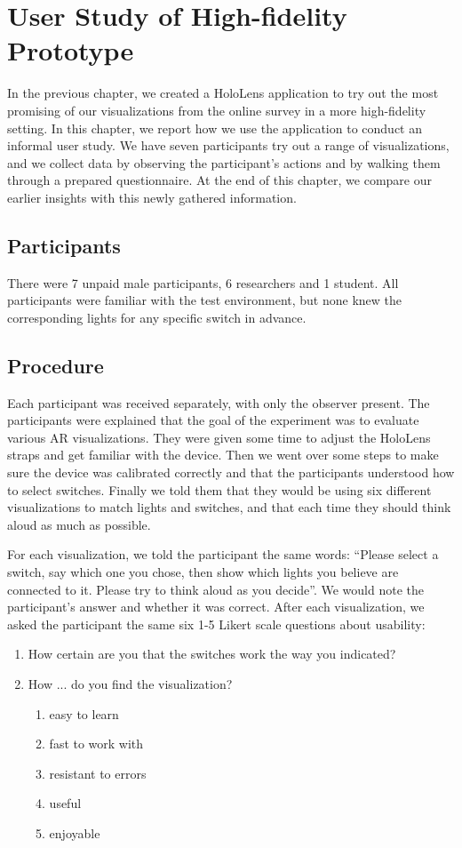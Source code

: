 \chapter{User Study of High-fidelity Prototype} \label{chap:user}
In the previous chapter, we created a HoloLens application to try out the most promising of our visualizations from the online survey in a more high-fidelity setting. In this chapter, we report how we use the application to conduct an informal user study. We have seven participants try out a range of visualizations, and we collect data by observing the participant's actions and by walking them through a prepared questionnaire. At the end of this chapter, we compare our earlier insights with this newly gathered information.

\section{Participants} \label{sec:user:survey:participants}
There were 7 unpaid male participants, 6 researchers and 1 student. All participants were familiar with the test environment, but none knew the corresponding lights for any specific switch in advance.

\section{Procedure} \label{sec:user:survey:procedure}
Each participant was received separately, with only the observer present. The participants were explained that the goal of the experiment was to evaluate various AR visualizations. They were given some time to adjust the HoloLens straps and get familiar with the device. Then we went over some steps to make sure the device was calibrated correctly and that the participants understood how to select switches. Finally we told them that they would be using six different visualizations to match lights and switches, and that each time they should think aloud as much as possible.

For each visualization, we told the participant the same words: ``Please select a switch, say which one you chose, then show which lights you believe are connected to it. Please try to think aloud as you decide''. We would note the participant's answer and whether it was correct. After each visualization, we asked the participant the same six 1-5 Likert scale questions about usability:
\begin{enumerate}
  \item How certain are you that the switches work the way you indicated?
  \item How ... do you find the visualization?
  \begin{enumerate}
    \item easy to learn
    \item fast to work with
    \item resistant to errors
    \item useful
    \item enjoyable
  \end{enumerate}
\end{enumerate}

